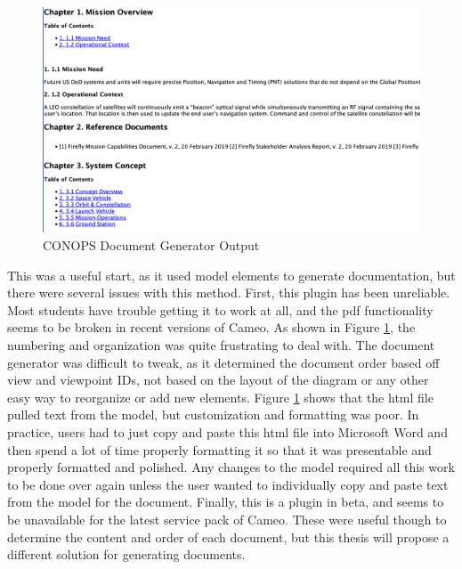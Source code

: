 \begin{figure}[H]
    \centering
    \includegraphics[width=\textwidth]{Thesis/Literature_Review/Lit Review Figures/old method of doc generator 2.png}
    \caption{CONOPS Document Generator Output}
    \label{fig:CONOPS Document Generator Output 2}
\end{figure}

This was a useful start, as it used model elements to generate documentation, but there were several issues with this method. First, this plugin has been unreliable. Most students have trouble getting it to work at all, and the pdf functionality seems to be broken in recent versions of Cameo. As shown in Figure \ref{fig:CONOPS Document Generator Output 2}, the numbering and organization was quite frustrating to deal with. The document generator was difficult to tweak, as it determined the document order based off view and viewpoint IDs, not based on the layout of the diagram or any other easy way to reorganize or add new elements. Figure \ref{fig:CONOPS Document Generator Output 2} shows that the html file pulled text from the model, but customization and formatting was poor. In practice, users had to just copy and paste this html file into Microsoft Word and then spend a lot of time properly formatting it so that it was presentable and properly formatted and polished. Any changes to the model required all this work to be done over again unless the user wanted to individually copy and paste text from the model for the document. Finally, this is a plugin in beta, and seems to be unavailable for the latest service pack of Cameo. These were useful though to determine the content and order of each document, but this thesis will propose a different solution for generating documents. 